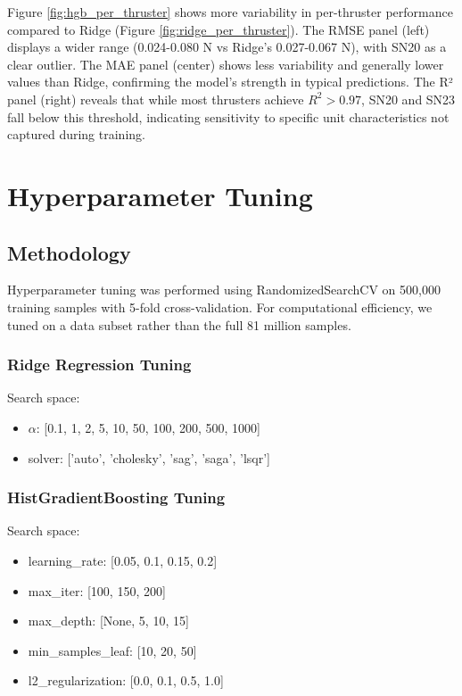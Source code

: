\documentclass[12pt,a4paper]{article}
\begin{document}
Figure \ref{fig:hgb_per_thruster} shows more variability in per-thruster performance compared to Ridge (Figure \ref{fig:ridge_per_thruster}). The RMSE panel (left) displays a wider range (0.024-0.080 N vs Ridge's 0.027-0.067 N), with SN20 as a clear outlier. The MAE panel (center) shows less variability and generally lower values than Ridge, confirming the model's strength in typical predictions. The R² panel (right) reveals that while most thrusters achieve $R^2 > 0.97$, SN20 and SN23 fall below this threshold, indicating sensitivity to specific unit characteristics not captured during training.

\section{Hyperparameter Tuning}

\subsection{Methodology}

Hyperparameter tuning was performed using RandomizedSearchCV on 500,000 training samples with 5-fold cross-validation. For computational efficiency, we tuned on a data subset rather than the full 81 million samples.

\subsubsection{Ridge Regression Tuning}

Search space:
\begin{itemize}
    \item $\alpha$: [0.1, 1, 2, 5, 10, 50, 100, 200, 500, 1000]
    \item solver: ['auto', 'cholesky', 'sag', 'saga', 'lsqr']
\end{itemize}

\subsubsection{HistGradientBoosting Tuning}

Search space:
\begin{itemize}
    \item learning\_rate: [0.05, 0.1, 0.15, 0.2]
    \item max\_iter: [100, 150, 200]
    \item max\_depth: [None, 5, 10, 15]
    \item min\_samples\_leaf: [10, 20, 50]
    \item l2\_regularization: [0.0, 0.1, 0.5, 1.0]
\end{itemize}
\end{document}
